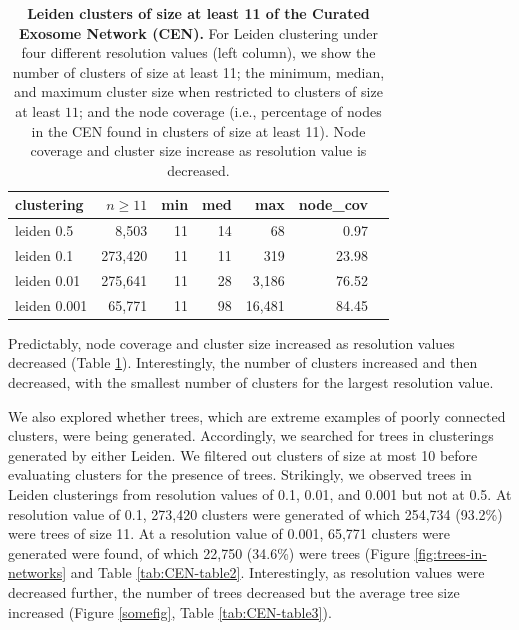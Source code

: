 \documentclass[11pt]{article}   	%
\begin{document}
\begin{table}[ht]
\centering
\begin{tabular}{lrrrrrr}
  \hline
 clustering & $n \geq 11$ & min & med & max & node\_cov \\
  \hline
 leiden 0.5 &   8,503 & 11 & 14 & 68 & 0.97 \\
 leiden 0.1 &   273,420 & 11 & 11 & 319 & 23.98 \\
  leiden 0.01   & 275,641 & 11 & 28 & 3,186 & 76.52 \\
  leiden 0.001   &65,771 & 11 & 98 & 16,481 & 84.45 \\
   \hline
\end{tabular}
\caption{\textbf{Leiden clusters of size at least 11 of the Curated Exosome Network (CEN).}
For Leiden clustering under four different resolution values (left column), we show  the number of clusters of size at least 11;  the minimum, median, and
maximum cluster size when restricted to clusters of size at least $11$; and the node coverage (i.e., percentage of nodes in the CEN found in clusters of size at least 11).
Node coverage and cluster size increase as resolution value is decreased.}
\label{tab:CEN-table1}
\end{table}

Predictably, node coverage and cluster size increased as resolution values  decreased (Table \ref{tab:CEN-table1}). 
Interestingly, the number of clusters increased and then decreased, with the smallest number of clusters for the largest
resolution value.

We also explored whether trees, which are extreme examples of poorly connected clusters, were being generated. Accordingly, we searched for trees in clusterings generated by either Leiden. We filtered out clusters of size at most 10 before evaluating clusters for the presence of trees. Strikingly, we observed trees in Leiden clusterings from resolution values of 0.1, 0.01, and 0.001 but not at 0.5. At resolution value of 0.1, 273,420 clusters were generated of which 254,734 (93.2\%) were trees of size 11. At a resolution value of 0.001, 65,771 clusters were generated were found, of which 22,750 (34.6\%) were
trees (Figure \ref{fig:trees-in-networks} and Table \ref{tab:CEN-table2}.
 Interestingly, as resolution values were decreased further, the number of trees decreased but the average tree size increased (Figure \ref{somefig}, Table \ref{tab:CEN-table3}).
\end{document}
